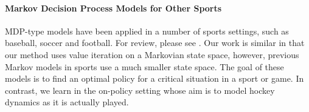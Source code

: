 \documentclass[]{article}
\begin{document}
\paragraph{Markov Decision Process Models for Other Sports} MDP-type models have been applied in a number of sports settings, such as baseball, soccer and football. For review, please see \cite{Cervone2014a}.
Our work is similar in that our method uses value iteration on a Markovian state space, however, previous Markov models in sports use a much smaller state space.
The goal of these models is to find an optimal policy for a critical situation in a sport or game.
In contrast, we learn in the on-policy setting whose aim is to model hockey dynamics as it is actually played.



%
%


\end{document}
